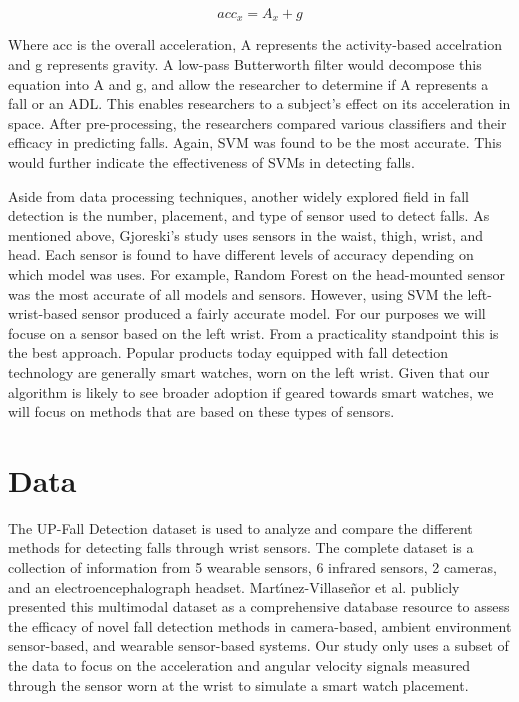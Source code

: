 \documentclass{llncs}
\begin{document}
    \begin{equation*}
    	acc_{x} = A_{x} + g
    \end{equation*}
    
    Where acc is the overall acceleration, A represents the activity-based accelration and g represents gravity. A low-pass Butterworth filter would decompose this equation into A and g, and allow the researcher to determine if A represents a fall or an ADL. This enables researchers to a subject's effect on its acceleration in space. After pre-processing, the researchers compared various classifiers and their efficacy in predicting falls. Again, SVM was found to be the most accurate. This would further indicate the effectiveness of SVMs in detecting falls. \cite{hussainelderly2019}
    
    Aside from data processing techniques, another widely explored field in fall detection is the number, placement, and type of sensor used to detect falls. As mentioned above, Gjoreski's study uses sensors in the waist, thigh, wrist, and head. Each sensor is found to have different levels of accuracy depending on which model was uses. For example, Random Forest on the head-mounted sensor was the most accurate of all models and sensors. However, using SVM the left-wrist-based sensor produced a fairly accurate model. \cite{gjoreski2016accurately} For our purposes we will focuse on a sensor based on the left wrist. From a practicality standpoint this is the best approach. Popular products today equipped with fall detection technology are generally smart watches, worn on the left wrist. Given that our algorithm is likely to see broader adoption if geared towards smart watches, we will focus on methods that are based on these types of sensors.
     
\section{Data}
The UP-Fall Detection dataset is used to analyze and compare the different methods for detecting falls through wrist sensors. The complete dataset is a collection of information from 5 wearable sensors, 6 infrared sensors, 2 cameras, and an electroencephalograph headset. Mart{\'\i}nez-Villase{\~n}or et al. publicly presented this multimodal dataset as a comprehensive database resource to assess the efficacy of novel fall detection methods in camera-based, ambient environment sensor-based, and wearable sensor-based systems. \cite{martinez2019up} Our study only uses a subset of the data to focus on the acceleration and angular velocity signals measured through the sensor worn at the wrist to simulate a smart watch placement.
 
\end{document}
